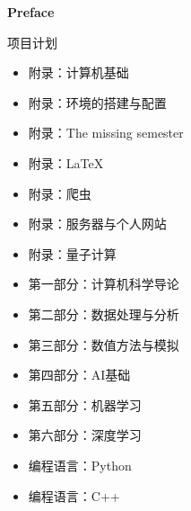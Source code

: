 
\begin{center}
	\Huge \textbf{\textcolor{fblack}{Preface}}
\end{center}

\begin{ubox}{项目计划}
	\begin{itemize}
		\item 附录：计算机基础
		\item 附录：环境的搭建与配置
		\item 附录：The missing semester 
		\item 附录：\LaTeX
		\item 附录：爬虫
		\item 附录：服务器与个人网站
		\item 附录：量子计算
		
		\item 第一部分：计算机科学导论
		\item 第二部分：数据处理与分析
		\item 第三部分：数值方法与模拟
		\item 第四部分：AI基础
		\item 第五部分：机器学习
		\item 第六部分：深度学习
		
		\item 编程语言：Python
		\item 编程语言：C++
	\end{itemize}
\end{ubox}